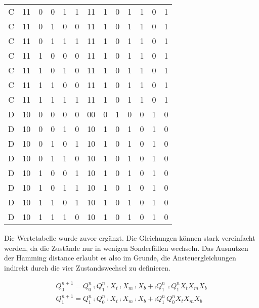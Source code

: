 \documentclass{CInf_practice}
\begin{document}
\begin{tabular}{cc|mmm|m|c|mmm|mmm}
C & 11 & 0 & 0 & 1 & 1 & 11 & 1 & 0 & 1 & 1 & 0 & 1 \\
C & 11 & 0 & 1 & 0 & 0 & 11 & 1 & 0 & 1 & 1 & 0 & 1 \\
C & 11 & 0 & 1 & 1 & 1 & 11 & 1 & 0 & 1 & 1 & 0 & 1 \\
C & 11 & 1 & 0 & 0 & 0 & 11 & 1 & 0 & 1 & 1 & 0 & 1 \\
C & 11 & 1 & 0 & 1 & 0 & 11 & 1 & 0 & 1 & 1 & 0 & 1 \\
C & 11 & 1 & 1 & 0 & 0 & 11 & 1 & 0 & 1 & 1 & 0 & 1 \\
C & 11 & 1 & 1 & 1 & 1 & 11 & 1 & 0 & 1 & 1 & 0 & 1 \\ \hline
D & 10 & 0 & 0 & 0 & 0 & 00 & 0 & 1 & 0 & 0 & 1 & 0 \\
D & 10 & 0 & 0 & 1 & 0 & 10 & 1 & 0 & 1 & 0 & 1 & 0 \\
D & 10 & 0 & 1 & 0 & 1 & 10 & 1 & 0 & 1 & 0 & 1 & 0 \\
D & 10 & 0 & 1 & 1 & 0 & 10 & 1 & 0 & 1 & 0 & 1 & 0 \\
D & 10 & 1 & 0 & 0 & 1 & 10 & 1 & 0 & 1 & 0 & 1 & 0 \\
D & 10 & 1 & 0 & 1 & 1 & 10 & 1 & 0 & 1 & 0 & 1 & 0 \\
D & 10 & 1 & 1 & 0 & 1 & 10 & 1 & 0 & 1 & 0 & 1 & 0 \\
D & 10 & 1 & 1 & 1 & 0 & 10 & 1 & 0 & 1 & 0 & 1 & 0 \\ \hline
\end{tabular}


Die Wertetabelle wurde zuvor ergänzt. Die Gleichungen können stark vereinfacht werden, da die Zustände nur in wenigen Sonderfällen wechseln. Das Ausnutzen der Hamming distance erlaubt es also im Grunde, die Ansteuergleichungen indirekt durch die vier Zustandswechsel zu definieren.

\begin{align*} %
Q_0^{n+1} = Q_0^{n} \comp{Q_1^n \comp{X_t} \comp{X_m} \comp{X_b}} + \comp{Q_1^n}\, \comp{Q_1^n} X_t X_m X_b \\
Q_1^{n+1} = Q_1^{n} \comp{Q_0^n \comp{X_t} \comp{X_m} \comp{X_b}} + \comp{Q_1^n}\,       Q_0^n  X_t X_m X_b
\end{align*}
\end{document}

